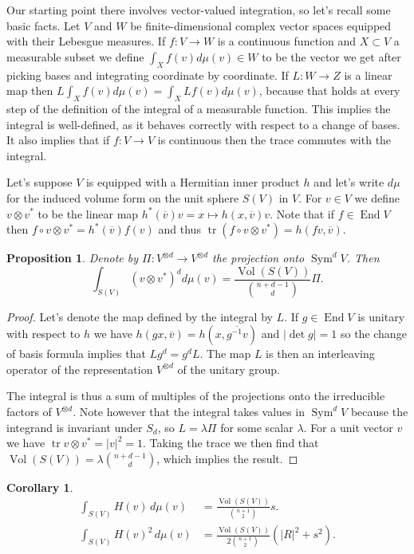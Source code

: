 \documentclass[10pt,a4paper]{amsart}
\newtheorem{prop}[theo]{Proposition}
\newtheorem{coro}[theo]{Corollary}
\theoremstyle{definition}
\def\ov#1{\overline{#1}}
\DeclareMathOperator{\Sym}{Sym}
\DeclareMathOperator{\tr}{tr}
\DeclareMathOperator{\Vol}{Vol}
\DeclareMathOperator{\End}{End}
\begin{document}
Our starting point there involves vector-valued integration, so let's recall
some basic facts.
Let $V$ and $W$ be finite-dimensional complex vector spaces equipped with their
Lebesgue measures.
If $f : V \to W$ is a continuous function and $X \subset V$ a measurable subset
we define $\int_X f(v) d\mu(v) \in W$ to be the vector we get after picking
bases and integrating coordinate by coordinate.
If $L : W \to Z$ is a linear map then $L \int_X f(v) d\mu(v) = \int_X Lf(v)
d\mu(v)$, because that holds at every step of the definition of the integral of
a measurable function.
This implies the integral is well-defined, as it behaves correctly with respect
to a change of bases.
It also implies that if $f : V \to V$ is continuous then the trace commutes
with the integral.

Let's suppose $V$ is equipped with a Hermitian inner product $h$
and let's write $d\mu$ for the induced volume form on the unit sphere $S(V)$ in
$V$. For $v \in V$ we define $v \otimes v^*$ to be the linear map
$h^*(\ov v) v = x \mapsto h(x, \ov v) v$.
Note that if $f \in \End V$ then $f \circ v \otimes v^* = h^*(\ov v) f(v)$
and thus $\tr(f \circ v \otimes v^*) = h(fv, \ov v)$.

\begin{prop}
\label{prop:int-id}
Denote by $\Pi : V^{\otimes d} \to V^{\otimes d}$ the projection onto $\Sym^d V$.
Then
$$
\int_{S(V)} (v \otimes v^*)^{d} d\mu(v)
= \frac{\Vol(S(V))}{\binom{n+d-1}{d}} \Pi.
$$
\end{prop}

\begin{proof}
Let's denote the map defined by the integral by $L$. If $g \in \End V$ is
unitary with respect to $h$ we have $h(g x, \ov v) = h(x, \ov{g^{-1} v})$ and
$|\!\det g| = 1$ so the change of basis formula implies that $L g^d = g^d L$.
The map $L$ is then an interleaving operator of the representation $V^{\otimes d}$
of the unitary group.

The integral is thus a sum of multiples of the projections onto the irreducible
factors of $V^{\otimes d}$.
Note however that the integral takes values in $\Sym^d V$ because the integrand
is invariant under $S_d$, so $L = \lambda \Pi$ for some scalar $\lambda$.
For a unit vector $v$ we have $\tr v \otimes v^* = |v|^2 = 1$.
Taking the trace we then find that $\Vol(S(V)) = \lambda \binom{n+d-1}{d}$,
which implies the result.
\end{proof}


\begin{coro}
\begin{align*}
\int_{S(V)} H(v) \, d\mu(v)
&= \frac{\Vol(S(V))}{\binom{n+1}{2}} s.
\\
\int_{S(V)} H(v)^2 \, d\mu(v)
&= \frac{\Vol(S(V))}{2\binom{n+1}{2}}(|R|^2 + s^2).
\end{align*}
\end{coro}
\end{document}

